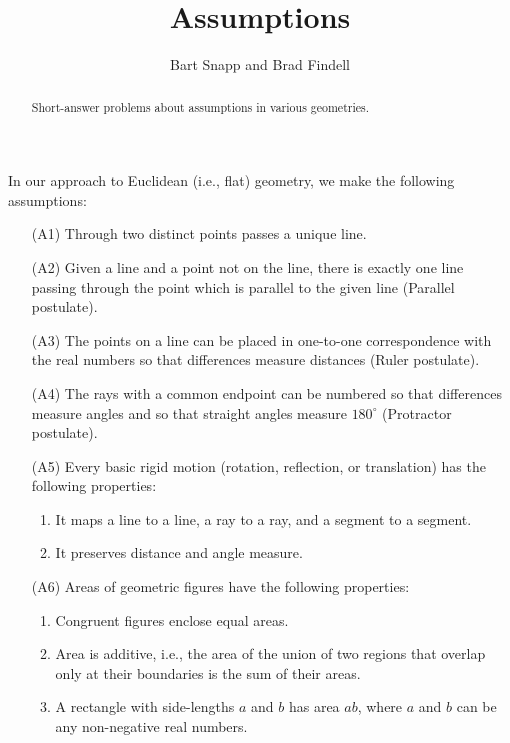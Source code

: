 \documentclass[nooutcomes]{ximera}
\title{Assumptions}
\author{Bart Snapp and Brad Findell}
\begin{document}
\begin{abstract}
Short-answer problems about assumptions in various geometries. 
\end{abstract}
\maketitle

In our approach to Euclidean (i.e., flat) geometry, we make the following assumptions:
\begin{itemize}
\item[(A1)] Through two distinct points passes a unique line.
\item[(A2)] Given a line and a point not on the line, there is exactly one line passing through the point which is parallel to the given line (Parallel postulate).
\item[(A3)] The points on a line can be placed in one-to-one correspondence with the real numbers so that differences measure distances (Ruler postulate).  
\item[(A4)] The rays with a common endpoint can be numbered so that differences measure angles and so that straight angles measure $180^\circ$ (Protractor postulate). 
\item[(A5)] Every basic rigid motion (rotation, reflection, or translation) has the following properties:
\begin{enumerate}
\item It maps a line to a line, a ray to a ray, and a segment to a segment.
\item It preserves distance and angle measure.
\end{enumerate}
\item [(A6)] Areas of geometric figures have the following properties: 
\begin{enumerate}
\item Congruent figures enclose equal areas.
\item Area is additive, i.e., the area of the union of two regions that overlap only at their boundaries is the sum of their areas. 
\item A rectangle with side-lengths $a$ and $b$ has area $ab$, where $a$ and $b$ can be any non-negative real numbers.
\end{enumerate}
\end{itemize}
\end{document}
